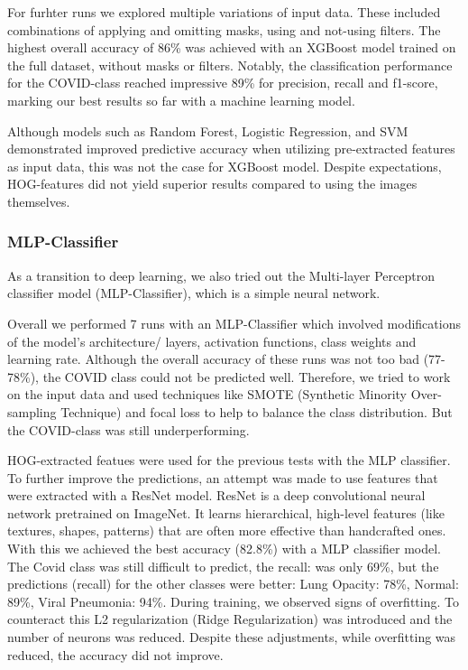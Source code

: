 \documentclass{article}
\begin{document}
For furhter runs we explored multiple variations of input data. These included combinations of applying and omitting masks, using and not-using filters. The highest overall accuracy of 86\% was achieved with an XGBoost model trained on the full dataset, without masks or filters. Notably, the classification performance for the COVID-class reached impressive 89\% for precision, recall and f1-score, marking our best results so far with a machine learning model.

Although models such as Random Forest, Logistic Regression, and SVM demonstrated improved predictive accuracy when utilizing pre-extracted features as input data, this was not the case for XGBoost model. Despite expectations, HOG-features did not yield superior results compared to using the images themselves.


\subsubsection {MLP-Classifier} 
As a transition to deep learning, we also tried out the Multi-layer Perceptron classifier model (MLP-Classifier), which is a simple neural network. 

Overall we performed 7 runs with an MLP-Classifier which involved modifications of the model's architecture/ layers, activation functions, class weights and learning rate. Although the overall accuracy of these runs was not too bad (77-78\%), the COVID class could not be predicted well. Therefore, we tried to work on the input data and used techniques like SMOTE (Synthetic Minority Over-sampling Technique) and focal loss to help to balance the class distribution. But the COVID-class was still underperforming. 

HOG-extracted featues were used for the previous tests with the MLP classifier. To further improve the predictions, an attempt was made to use features that were extracted with a ResNet model. ResNet is a deep convolutional neural network pretrained on ImageNet. It learns hierarchical, high-level features (like textures, shapes, patterns) that are often more effective than handcrafted ones. With this we achieved the best accuracy (82.8\%) with a MLP classifier model. The Covid class was still difficult to predict, the recall: was only 69\%, but the predictions (recall) for the other classes were better: Lung Opacity: 78\%, Normal: 89\%, Viral Pneumonia: 94\%.
During training, we observed signs of overfitting. To counteract this L2 regularization (Ridge Regularization) was introduced and the number of neurons was reduced. Despite these adjustments, while overfitting was reduced, the accuracy did not improve.
\end{document}
